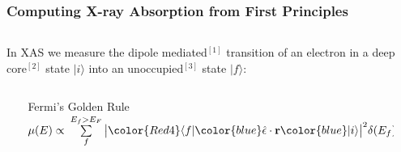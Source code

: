 \newcommand{\GMS}{\mathbb{G}}
\newcommand{\Gnot}{\mathsf{G^0}}
\newcommand{\tmat}{\mathsf{t}}
\newcommand{\boldr}{\boldsymbol{r}}

\begin{frame}[label=fgr]
  \frametitle{Computing X-ray Absorption from First Principles}
  \begin{columns}
    \begin{column}{0.75\linewidth}
      In XAS we measure the \alert{dipole mediated}$^\mathrm{[1]}$
      transition of an electron in a \alert{deep core}$^\mathrm{[2]}$
      state {\color{blue}$|i\rangle$} into an
      \alert{unoccupied}$^\mathrm{[3]}$ state
      {\color{Red4}$|f\rangle$}:

      \begin{columns}
        \begin{column}{0.15\linewidth}
          ~
        \end{column}
        \begin{column}{0.7\linewidth}
          \begin{block}{Fermi's Golden Rule}
            $\mu(E) \propto\> \sum\limits_f^{E_f>E_F}
            \big|{\color{Red4}\langle f|}
            {\color{blue}\hat{\epsilon}\cdot\mathbf{r}}
            {\color{blue}|i\rangle}\big|^2 \delta(E_f)$
          \end{block}
        \end{column}
        \begin{column}{0.15\linewidth}
          ~
        \end{column}
      \end{columns}

      \medskip


\end{column}
\end{columns}
\end{frame}
